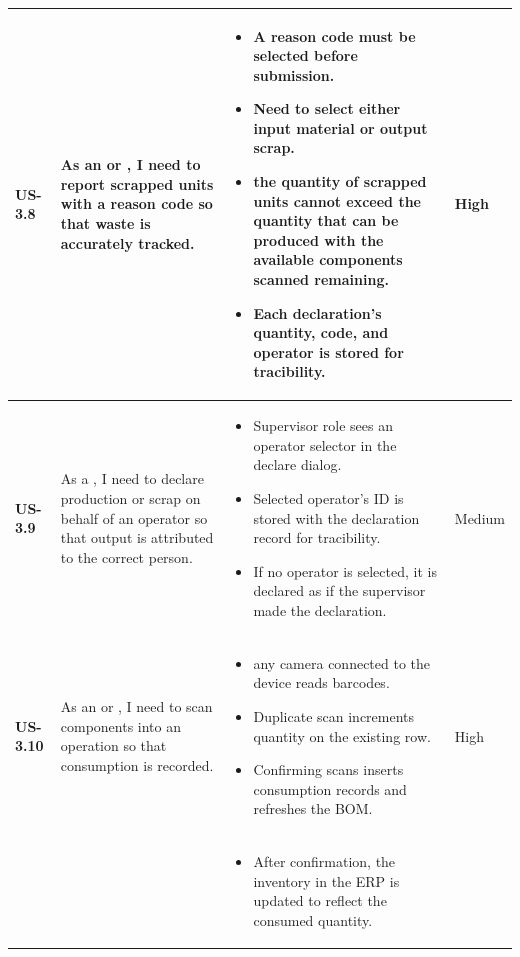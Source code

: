 \begin{longtable}{p{1.5cm} p{5cm} p{6.5cm} p{2cm}}
	\textbf{US-3.8} &
	As an \userrole{Operator} or \userrole{Supervisor}, I need to report
	scrapped units with a reason code so that waste is accurately tracked.
	&
	\begin{itemize}[nosep, leftmargin=*]
	\item A reason code must be selected before submission.
	\item Need to select either input material or output scrap.
	\item the quantity of scrapped units cannot exceed the quantity 
	that can be produced with the available components scanned remaining.
	\item Each declaration's quantity, code, and operator is stored for tracibility.
	\end{itemize}
	& High \\ \midrule

	\textbf{US-3.9} &
	As a \userrole{Supervisor}, I need to declare production or scrap on behalf of an
	operator so that output is attributed to the correct person.
	&
	\begin{itemize}[nosep, leftmargin=*]
	\item Supervisor role sees an operator selector in the declare dialog.
	\item Selected operator's ID is stored with the declaration record for tracibility.
	\item If no operator is selected, it is declared as if the supervisor made the declaration.
	\end{itemize}
	& Medium \\ \midrule

	\textbf{US-3.10} &
	As an \userrole{Operator} or \userrole{Supervisor}, I need to scan
	components into an operation so that consumption is recorded.
	&
	\begin{itemize}[nosep, leftmargin=*]
	\item any camera connected to the device reads  barcodes.
	\item Duplicate scan increments quantity on the existing row.
	\item Confirming scans inserts consumption records and refreshes the BOM.
	\end{itemize} & High \\ & & 
	\begin{itemize}[nosep, leftmargin=*]
	\item After confirmation, the inventory in the ERP is updated to reflect the consumed quantity.
	\end{itemize}
	& \\ \midrule


\end{longtable}
